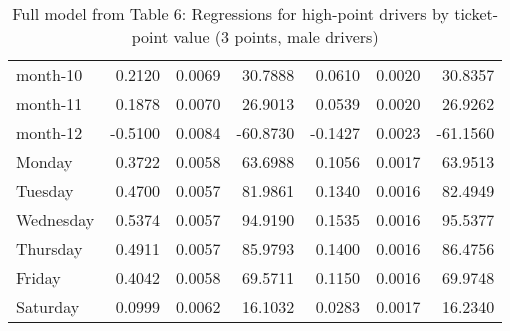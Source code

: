 \documentclass[10pt]{article}
\begin{document}
\begin{table}[ht]
\begin{tabular}{lrrrrrr}
  month-10 & 0.2120 & 0.0069 & 30.7888 & 0.0610 & 0.0020 & 30.8357 \\ 
  month-11 & 0.1878 & 0.0070 & 26.9013 & 0.0539 & 0.0020 & 26.9262 \\ 
  month-12 & -0.5100 & 0.0084 & -60.8730 & -0.1427 & 0.0023 & -61.1560 \\ 
  Monday & 0.3722 & 0.0058 & 63.6988 & 0.1056 & 0.0017 & 63.9513 \\ 
  Tuesday & 0.4700 & 0.0057 & 81.9861 & 0.1340 & 0.0016 & 82.4949 \\ 
  Wednesday & 0.5374 & 0.0057 & 94.9190 & 0.1535 & 0.0016 & 95.5377 \\ 
  Thursday & 0.4911 & 0.0057 & 85.9793 & 0.1400 & 0.0016 & 86.4756 \\ 
  Friday & 0.4042 & 0.0058 & 69.5711 & 0.1150 & 0.0016 & 69.9748 \\ 
  Saturday & 0.0999 & 0.0062 & 16.1032 & 0.0283 & 0.0017 & 16.2340 \\ 
   \hline
\end{tabular}
\caption{Full model from Table 6: Regressions for high-point drivers by ticket-point value (3 points, male drivers)} 
\label{tab_6_3_pts_no_age_M}
\end{table}


\clearpage
\pagebreak



\end{document}
